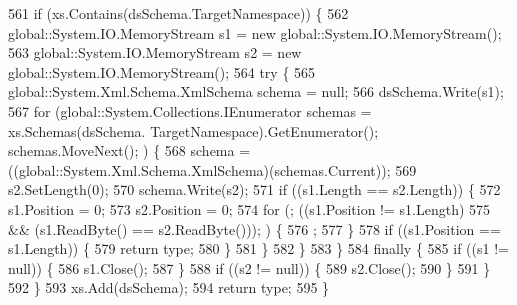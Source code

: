 \begin{DoxyCode}
561                 \textcolor{keywordflow}{if} (xs.Contains(dsSchema.TargetNamespace)) \{
562                     global::System.IO.MemoryStream s1 = \textcolor{keyword}{new} global::System.IO.MemoryStream();
563                     global::System.IO.MemoryStream s2 = \textcolor{keyword}{new} global::System.IO.MemoryStream();
564                     \textcolor{keywordflow}{try} \{
565                         global::System.Xml.Schema.XmlSchema schema = null;
566                         dsSchema.Write(s1);
567                         \textcolor{keywordflow}{for} (global::System.Collections.IEnumerator schemas = xs.Schemas(dsSchema.
      TargetNamespace).GetEnumerator(); schemas.MoveNext(); ) \{
568                             schema = ((global::System.Xml.Schema.XmlSchema)(schemas.Current));
569                             s2.SetLength(0);
570                             schema.Write(s2);
571                             \textcolor{keywordflow}{if} ((s1.Length == s2.Length)) \{
572                                 s1.Position = 0;
573                                 s2.Position = 0;
574                                 \textcolor{keywordflow}{for} (; ((s1.Position != s1.Length) 
575                                             && (s1.ReadByte() == s2.ReadByte())); ) \{
576                                     ;
577                                 \}
578                                 \textcolor{keywordflow}{if} ((s1.Position == s1.Length)) \{
579                                     \textcolor{keywordflow}{return} type;
580                                 \}
581                             \}
582                         \}
583                     \}
584                     \textcolor{keywordflow}{finally} \{
585                         \textcolor{keywordflow}{if} ((s1 != null)) \{
586                             s1.Close();
587                         \}
588                         \textcolor{keywordflow}{if} ((s2 != null)) \{
589                             s2.Close();
590                         \}
591                     \}
592                 \}
593                 xs.Add(dsSchema);
594                 \textcolor{keywordflow}{return} type;
595             \}
\end{DoxyCode}
